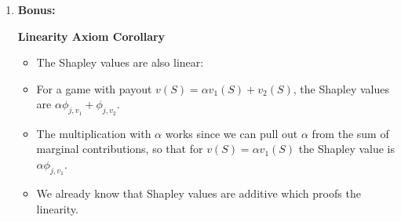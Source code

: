 {\begin{enumerate}
\begin{proofsketch}
\medskip
\noindent
\textbf{Step 2: Telescoping within each permutation.}

Fix a particular permutation $\pi$.  List its elements in order:
\[
\bigl(\pi(1), \pi(2), \dots, \pi(k)\bigr).
\]
Within this permutation, the inner sum
\(\sum_{j=1}^k
\bigl[v(\mathrm{Pred}_\pi(j)\cup\{j\}) - v(\mathrm{Pred}_\pi(j))\bigr]\)
can be viewed as a chain of marginal contributions:
\[
v\bigl(\{\pi(1)\}\bigr) - v(\varnothing)
\;+\;
v\bigl(\{\pi(1), \pi(2)\}\bigr) - v\bigl(\{\pi(1)\}\bigr)
\;+\;\dots\;+\;
v\bigl(\{\pi(1),\ldots,\pi(k)\}\bigr) - v\bigl(\{\pi(1),\ldots,\pi(k-1)\}\bigr).
\]
All intermediate terms telescope, leaving exactly
\[
v\bigl(\{\pi(1),\ldots,\pi(k)\}\bigr)
\;-\;
v(\varnothing)
\;=\;
v(P)
\;-\;
0
\;=\;
v(P).
\]

\medskip
\noindent
\textbf{Step 3: Average over all permutations.}

Since every permutation $\pi$ yields exactly $v(P)$ in the telescoped sum, we have
\[
\sum_{j=1}^k \phi_j
\;=\;
\frac{1}{k!}
\sum_{\pi \in \mathfrak{S}_P} 
v(P)
\;=\;
\frac{1}{k!} \times \bigl(k! \cdot v(P)\bigr)
\;=\;
v(P).
\]
Hence
\[
\sum_{j=1}^k \phi_j 
\;=\;
v(P).
\]
\end{proofsketch}
    
    \item \textbf{Bonus:}

    \textbf{Linearity Axiom Corollary}
      \begin{itemize}
      \item The Shapley values are also linear:
      \item For a game with payout $v(S) = \alpha v_1(S) + v_2(S)$, the Shapley values are $\alpha \phi_{j,v_1} + \phi_{j,v_2}$.
      \item The multiplication with $\alpha$ works since we can pull out $\alpha$ from the sum of marginal contributions, so that for $v(S) = \alpha v_1(S)$ the Shapley value is $\alpha \phi_{j,v_1}$.
      \item We already know that Shapley values are additive which proofs the linearity.
      \end{itemize}
    
\end{enumerate}

}
